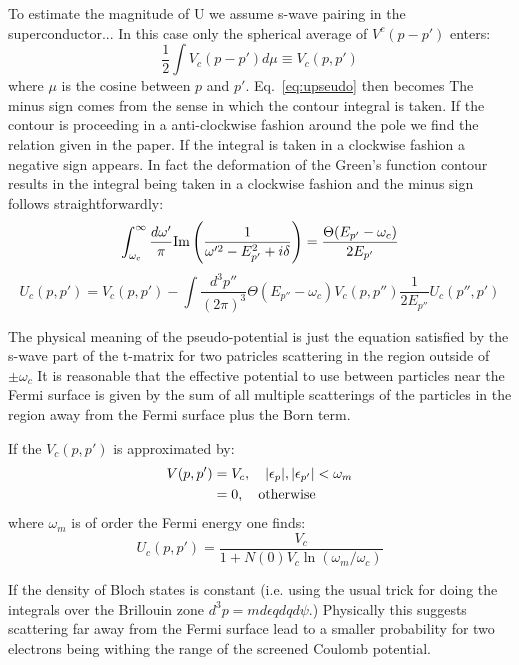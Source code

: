 To estimate the magnitude of U we assume s-wave pairing in the superconductor...
In this case only the spherical average of $V^{c}(p-p')$ enters:
%
\begin{equation}
\frac{1}{2}\int V_{c}(p-p') d\mu \equiv V_{c}(p,p')
\end{equation}
%
where $\mu$ is the cosine between $p$ and $p'$. Eq.~\ref{eq:upseudo} then becomes 
{\color{blue} The minus sign comes from the sense in which the contour integral
is taken. If the contour is proceeding in a anti-clockwise fashion around the pole
we find the relation given in the paper. If the integral is taken in a clockwise 
fashion a negative sign appears. In fact the deformation of the Green's function contour 
results in the integral being taken in a clockwise fashion and the minus sign follows
straightforwardly}:
%
\begin{equation}
\int_{\omega_{c}}^{\infty}\frac{d\omega'}{\pi} {\rm Im} \left(\frac{1}{\omega'^{2} - E^{2}_{p'} + i\delta} \right)= \frac{\Theta(E_{p'} - \omega_{c})}{2E_{p'}} 
\end{equation}
%
\begin{equation}
U_{c}(p,p') = V_{c}(p,p') - \int \frac{d^{3}p''}{(2\pi)^{3}} \Theta(E_{p''} - \omega_{c})V_{c}(p,p'') \frac{1}{2E_{p''}}U_{c}(p'',p')
\end{equation}
%

The physical meaning of the pseudo-potential  is just the equation satisfied by the s-wave part 
of the t-matrix for two patricles scattering in the region outside of $\pm \omega_c$ It is reasonable that
the effective potential to use between particles near
the Fermi surface is given by the sum of all multiple scatterings of 
the particles in the region away from the Fermi surface plus the Born term.

If the $V_{c}(p,p')$ is approximated by:
%
\begin{align}
V(p,p') & =  V_{c}, \quad |\epsilon_{p}|, |\epsilon_{p'}| < \omega_{m} \nonumber \\
        & =  0, \quad {\rm otherwise}
\end{align}
%
where $\omega_{m}$ is of order the Fermi energy one finds:
%
\begin{equation}
U_{c}(p,p') = \frac{V_{c}}{1+N(0)V_{c}\ln(\omega_{m}/\omega_{c})}
\end{equation}
%

If the density of Bloch states is constant (i.e. using the usual trick for doing the integrals over 
the Brillouin zone $d^{3}p = m d\epsilon qdq d\psi$.) Physically this suggests scattering far
away from the Fermi surface lead to a smaller probability for two electrons being withing the range of the 
screened Coulomb potential.


